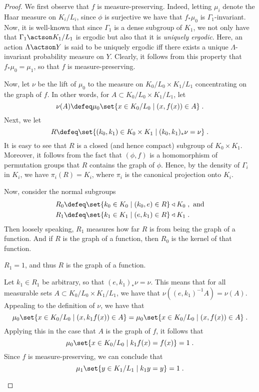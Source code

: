 \documentclass[oneside,leqno,11pt]{amsart}
\begin{document}
\begin{proof}
  We first observe that $f$ is measure-preserving.  Indeed, letting
  $\mu_i$ denote the Haar measure on $K_i/L_i$, since $\phi$ is
  surjective we have that $f_*\mu_0$ is $\Gamma_1$-invariant.  Now, it
  is well-known that since $\Gamma_1$ is a dense subgroup of $K_1$, we
  not only have that $\Gamma_1\actson K_1/L_1$ is ergodic but also
  that it is \emph{uniquely ergodic}.  Here, an action $\Lambda\actson
  Y$ is said to be uniquely ergodic iff there exists a unique
  $\Lambda$-invariant probability measure on $Y$.  Clearly, it follows
  from this property that $f_*\mu_0=\mu_1$, so that $f$ is
  measure-preserving.

  Now, let $\nu$ be the lift of $\mu_0$ to the measure on
  $K_0/L_0\times K_1/L_1$ concentrating on the graph of $f$.  In other
  words, for $A\subset K_0/L_0\times K_1/L_1$, let
  \[\nu(A)\defeq\mu_0\set{x\in K_0/L_0\mid(x,f(x))\in A}\;.
  \]
  Next, we let
  \[R\defeq\set{(k_0,k_1)\in K_0\times K_1\mid(k_0,k_1)_*\nu=\nu}\;.
  \]
  It is easy to see that $R$ is a closed (and hence compact) subgroup
  of $K_0\times K_1$.  Moreover, it follows from the fact that
  $(\phi,f)$ is a homomorphism of permutation groups that $R$ contains
  the graph of $\phi$.  Hence, by the density of $\Gamma_i$ in $K_i$,
  we have $\pi_i(R)=K_i$, where $\pi_i$ is the canonical projection
  onto $K_i$.

  Now, consider the normal subgroups
  \begin{align*}
    R_0&\defeq\set{k_0\in K_0\mid(k_0,e)\in R}\triangleleft K_0\;,
      \textrm{ and}\\
    R_1&\defeq\set{k_1\in K_1\mid(e,k_1)\in R}\triangleleft K_1\;.
  \end{align*}
  Then loosely speaking, $R_1$ measures how far $R$ is from being the
  graph of a function.  And if $R$ is the graph of a function, then
  $R_0$ is the kernel of that function.
  
  \begin{claim*}
    $R_1=1$, and thus $R$ is the graph of a function.
  \end{claim*}
  \begin{claimproof}
    Let $k_1\in R_1$ be arbitrary, so that $(e,k_1)_*\nu=\nu$.  This
    means that for all measurable sets $A\subset K_0/L_0\times
    K_1/L_1$, we have that $\nu((e,k_1)^{-1}A)=\nu(A)$.  Appealing to
    the definition of $\nu$, we have that
    \[\mu_0\set{x\in K_0/L_0\mid(x,k_1f(x))\in A}
    = \mu_0\set{x\in K_0/L_0\mid(x,f(x))\in A}\;.
    \]
    Applying this in the case that $A$ is the graph of $f$, it follows
    that
    \[\mu_0\set{x\in K_0/L_0\mid k_1f(x)=f(x)}=1\;.
    \]
    Since $f$ is measure-preserving, we can conclude that
    \[\mu_1\set{y\in K_1/L_1\mid k_1y=y}=1\;.
    \]


\end{claimproof}
\end{proof}
\end{document}
